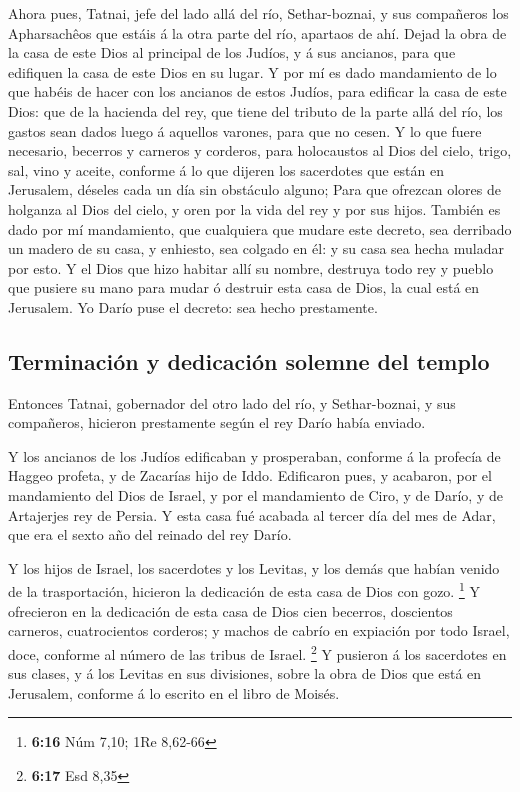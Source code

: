  Ahora pues, Tatnai, jefe del lado allá del río,
Sethar-boznai, y sus compañeros los Apharsachêos que estáis á la otra
parte del río, apartaos de ahí.  Dejad la obra de la casa de
este Dios al principal de los Judíos, y á sus ancianos, para que
edifiquen la casa de este Dios en su lugar.  Y por mí es
dado mandamiento de lo que habéis de hacer con los ancianos de estos
Judíos, para edificar la casa de este Dios: que de la hacienda del rey,
que tiene del tributo de la parte allá del río, los gastos sean dados
luego á aquellos varones, para que no cesen.  Y lo que fuere
necesario, becerros y carneros y corderos, para holocaustos al Dios del
cielo, trigo, sal, vino y aceite, conforme á lo que dijeren los
sacerdotes que están en Jerusalem, déseles cada un día sin obstáculo
alguno;  Para que ofrezcan olores de holganza al Dios del
cielo, y oren por la vida del rey y por sus hijos.  También
es dado por mí mandamiento, que cualquiera que mudare este decreto, sea
derribado un madero de su casa, y enhiesto, sea colgado en él: y su casa
sea hecha muladar por esto.  Y el Dios que hizo habitar
allí su nombre, destruya todo rey y pueblo que pusiere su mano para
mudar ó destruir esta casa de Dios, la cual está en Jerusalem. Yo Darío
puse el decreto: sea hecho prestamente.

\hypertarget{terminaciuxf3n-y-dedicaciuxf3n-solemne-del-templo}{%
\subsection{Terminación y dedicación solemne del
templo}\label{terminaciuxf3n-y-dedicaciuxf3n-solemne-del-templo}}

 Entonces Tatnai, gobernador del otro lado del río, y
Sethar-boznai, y sus compañeros, hicieron prestamente según el rey Darío
había enviado.

 Y los ancianos de los Judíos edificaban y prosperaban,
conforme á la profecía de Haggeo profeta, y de Zacarías hijo de Iddo.
Edificaron pues, y acabaron, por el mandamiento del Dios de Israel, y
por el mandamiento de Ciro, y de Darío, y de Artajerjes rey de Persia.
 Y esta casa fué acabada al tercer día del mes de Adar, que
era el sexto año del reinado del rey Darío.

 Y los hijos de Israel, los sacerdotes y los Levitas, y los
demás que habían venido de la trasportación, hicieron la dedicación de
esta casa de Dios con gozo. \footnote{\textbf{6:16} Núm 7,10; 1Re
  8,62-66}  Y ofrecieron en la dedicación de esta casa de
Dios cien becerros, doscientos carneros, cuatrocientos corderos; y
machos de cabrío en expiación por todo Israel, doce, conforme al número
de las tribus de Israel. \footnote{\textbf{6:17} Esd 8,35} 
Y pusieron á los sacerdotes en sus clases, y á los Levitas en sus
divisiones, sobre la obra de Dios que está en Jerusalem, conforme á lo
escrito en el libro de Moisés.

